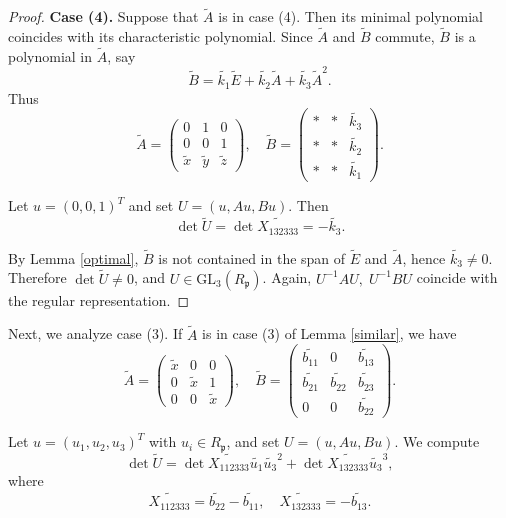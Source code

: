 \documentclass[12pt]{article}
\theoremstyle{plain}
\theoremstyle{definition}
\theoremstyle{remark}
\begin{document}
\begin{proof}
\textbf{Case (4).} Suppose that $\widetilde{A}$ is in case (4). Then its minimal polynomial coincides with its characteristic polynomial. Since $\widetilde{A}$ and $\widetilde{B}$ commute, $\widetilde{B}$ is a polynomial in $\widetilde{A}$, say
$$
\widetilde{B}=\widetilde{k_1}\widetilde{E}+\widetilde{k_2}\widetilde{A}+\widetilde{k_3}\widetilde{A}^2.
$$
Thus
$$
\widetilde{A}=\begin{pmatrix}
0 & 1 & 0 \\
0 & 0 & 1 \\
\widetilde{x} & \widetilde{y} & \widetilde{z}
\end{pmatrix},
\quad
\widetilde{B}=\begin{pmatrix}
* & * & \widetilde{k_3} \\
* & * & \widetilde{k_2} \\
* & * & \widetilde{k_1}
\end{pmatrix}.
$$

Let $u=(0,0,1)^T$ and set $U=(u,Au,Bu)$. Then
$$
\det \widetilde{U}=\det \widetilde{X_{132333}}=-\widetilde{k_3}.
$$

By Lemma \ref{optimal}, $\widetilde{B}$ is not contained in the span of $\widetilde{E}$ and $\widetilde{A}$, hence $\widetilde{k_3}\ne 0$. Therefore $\det \widetilde{U}\ne 0$, and $U \in \mathrm{GL}_3(R_\mathfrak{p})$. Again, $U^{-1}AU,\; U^{-1}BU$ coincide with the regular representation.
\end{proof}

Next, we analyze case (3). If $\widetilde{A}$ is in case (3) of Lemma \ref{similar}, we have
$$\widetilde{A}=\begin{pmatrix}
\widetilde{x} & 0 & 0 \\
0 & \widetilde{x} & 1 \\
0 & 0 & \widetilde{x}
\end{pmatrix},
\quad
\widetilde{B}=\begin{pmatrix}
\widetilde{b_{11}} & 0 & \widetilde{b_{13}} \\
\widetilde{b_{21}} & \widetilde{b_{22}} & \widetilde{b_{23}} \\
0 & 0 & \widetilde{b_{22}}
\end{pmatrix}.$$

Let $u=(u_1,u_2,u_3)^T$ with $u_i \in R_\mathfrak{p}$, and set $U=(u,Au,Bu)$. We compute
$$\det \widetilde{U}=\det \widetilde{X_{112333}}\widetilde{u_1}\widetilde{u_3}^2+\det \widetilde{X_{132333}}\widetilde{u_3}^3,$$
where
$$\widetilde{X_{112333}}=\widetilde{b_{22}}-\widetilde{b_{11}},\quad \widetilde{X_{132333}}=-\widetilde{b_{13}}.$$
\end{document}
